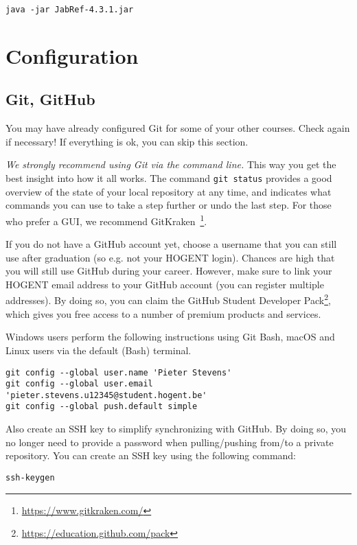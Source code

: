\begin{verbatim}
java -jar JabRef-4.3.1.jar
\end{verbatim}

\section{Configuration}

\subsection{Git, GitHub}

You may have already configured Git for some of your other courses. Check again if necessary! If everything is ok, you can skip this section.

\emph{We strongly recommend using Git via the command line.} 
This way you get the best insight into how it all works. The command \texttt{git status} provides a good overview of the state of your local repository at any time, and indicates what commands you can use to take a step further or undo the last step. 
For those who prefer a GUI, we recommend GitKraken~\footnote{\url{https://www.gitkraken.com/}}.

If you do not have a GitHub account yet, choose a username that you can still use after graduation (so e.g. not your HOGENT login). 
Chances are high that you will still use GitHub during your career. However, make sure to link your HOGENT email address to your GitHub account (you can register multiple addresses). By doing so, you can claim the GitHub Student Developer Pack\footnote{\url{https://education.github.com/pack}}, which gives you free access to a number of premium products and services.

Windows users perform the following instructions using Git Bash, macOS and Linux users via the default (Bash) terminal.

\begin{verbatim}
git config --global user.name 'Pieter Stevens'
git config --global user.email 'pieter.stevens.u12345@student.hogent.be'
git config --global push.default simple
\end{verbatim}

Also create an SSH key to simplify synchronizing with GitHub. By doing so, you no longer need to provide a password when pulling/pushing from/to a private repository. You can create an SSH key using the following command:

\begin{verbatim}
ssh-keygen
\end{verbatim}

